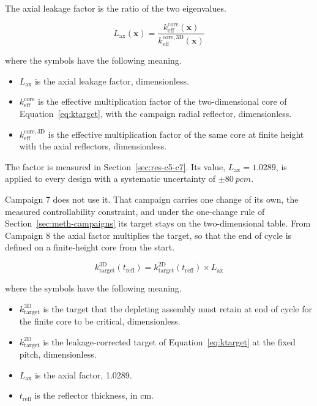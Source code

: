 The axial leakage factor is the ratio of the two eigenvalues.

\begin{equation}
L_\mathrm{ax}(\mathbf{x}) = \frac{k_\mathrm{eff}^\mathrm{core}(\mathbf{x})}{k_\mathrm{eff}^\mathrm{core,3D}(\mathbf{x})}
\label{eq:lax-def}
\end{equation}

\noindent where the symbols have the following meaning.

\begin{itemize}
  \item $L_\mathrm{ax}$ is the axial leakage factor, dimensionless.

  \item $k_\mathrm{eff}^\mathrm{core}$ is the effective multiplication
        factor of the two-dimensional core of
        Equation~\eqref{eq:ktarget}, with the campaign radial reflector,
        dimensionless.

  \item $k_\mathrm{eff}^\mathrm{core,3D}$ is the effective
        multiplication factor of the same core at finite height with the
        axial reflectors, dimensionless.
\end{itemize}

The factor is measured in Section~\ref{sec:res-c5-c7}. Its value,
$L_\mathrm{ax} = \num{1.0289}$, is applied to every design with a
systematic uncertainty of $\pm\SI{80}{pcm}$.

Campaign 7 does not use it. That campaign carries one change of its
own, the measured controllability constraint, and under the one-change rule
of Section~\ref{sec:meth-campaigns} its target stays on the
two-dimensional table. From Campaign 8 the axial factor multiplies the
target, so that the end of cycle is defined on a finite-height core
from the start.

\begin{equation}
k_\mathrm{target}^\mathrm{3D}(t_\mathrm{refl}) = k_\mathrm{target}^\mathrm{2D}(t_\mathrm{refl}) \times L_\mathrm{ax}
\label{eq:ktarget-3d}
\end{equation}

\noindent where the symbols have the following meaning.

\begin{itemize}
  \item $k_\mathrm{target}^\mathrm{3D}$ is the target that the depleting
        assembly must retain at end of cycle for the finite core to be
        critical, dimensionless.

  \item $k_\mathrm{target}^\mathrm{2D}$ is the leakage-corrected target of
        Equation~\eqref{eq:ktarget} at the fixed pitch, dimensionless.

  \item $L_\mathrm{ax}$ is the axial factor, \num{1.0289}.

  \item $t_\mathrm{refl}$ is the reflector thickness, in cm.
\end{itemize}

